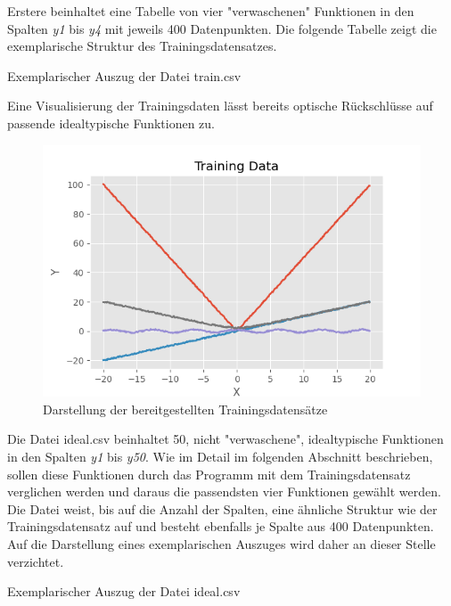 Erstere beinhaltet eine Tabelle von vier "verwaschenen" Funktionen in den Spalten \emph{y1} bis \emph{y4} mit jeweils 400 Datenpunkten. Die folgende Tabelle zeigt die exemplarische Struktur des Trainingsdatensatzes.

\begin{table}[H]
\small
\centering
{}
\caption{Exemplarischer Auszug der Datei train.csv}
\label{tab:train.csv}
\end{table} 


Eine Visualisierung der Trainingsdaten lässt bereits optische Rückschlüsse auf passende idealtypische Funktionen zu.
\begin{figure}[h]
\centering
\includegraphics[width=13cm]{../output/figures/train.png}
\caption{Darstellung der bereitgestellten Trainingsdatensätze \cite{Gage:18}}\label{fig:train}
\end{figure}

Die Datei ideal.csv beinhaltet 50, nicht "verwaschene", idealtypische Funktionen in den Spalten \emph{y1} bis \emph{y50}. Wie im Detail im folgenden Abschnitt beschrieben, sollen diese Funktionen durch das Programm mit dem Trainingsdatensatz verglichen werden und daraus die passendsten vier Funktionen gewählt werden. Die Datei weist, bis auf die Anzahl der Spalten, eine ähnliche Struktur wie der Trainingsdatensatz auf und besteht ebenfalls je Spalte aus 400 Datenpunkten. Auf die Darstellung eines exemplarischen Auszuges wird daher an dieser Stelle verzichtet.

\begin{table}[H]
\small
\centering
{}
\caption{Exemplarischer Auszug der Datei ideal.csv}
\label{tab:ideal.csv}
\end{table} 

